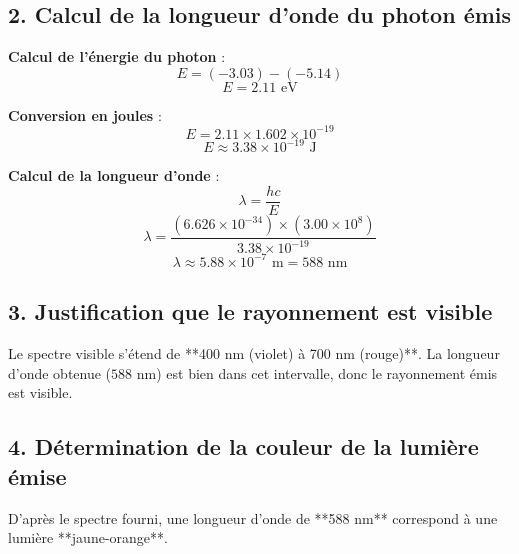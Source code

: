 \documentclass[a4paper,12pt]{article}
\begin{document}
\subsection*{2. Calcul de la longueur d'onde du photon émis}
\begin{compactenum}
    \item \textbf{Calcul de l'énergie du photon} :
    \begin{equation}
        E = (-3.03) - (-5.14)
    \end{equation}
    \begin{equation}
        E = 2.11 \text{ eV}
    \end{equation}
    
    \item \textbf{Conversion en joules} :
    \begin{equation}
        E = 2.11 \times 1.602 \times 10^{-19}
    \end{equation}
    \begin{equation}
        E \approx 3.38 \times 10^{-19} \text{ J}
    \end{equation}
    
    \item \textbf{Calcul de la longueur d’onde} :
    \begin{equation}
        \lambda = \frac{h c}{E}
    \end{equation}
    \begin{equation}
        \lambda = \frac{(6.626 \times 10^{-34}) \times (3.00 \times 10^8)}{3.38 \times 10^{-19}}
    \end{equation}
    \begin{equation}
        \lambda \approx 5.88 \times 10^{-7} \text{ m} = 588 \text{ nm}
    \end{equation}
\end{compactenum}

\subsection*{3. Justification que le rayonnement est visible}
Le spectre visible s'étend de **400 nm (violet) à 700 nm (rouge)**. 
La longueur d’onde obtenue ($588$ nm) est bien dans cet intervalle, donc le rayonnement émis est visible.

\subsection*{4. Détermination de la couleur de la lumière émise}
D’après le spectre fourni, une longueur d’onde de **588 nm** correspond à une lumière **jaune-orange**.
\end{document}
